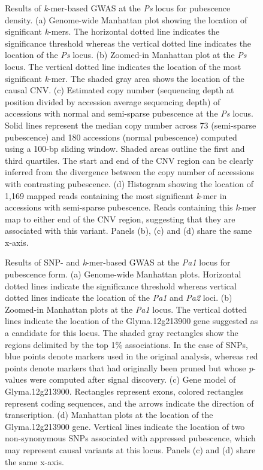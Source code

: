 \documentclass[doublespacing]{bmcart}
\begin{document}
\begin{backmatter}
\begin{figure}[p]
	\caption[Results of \textit{k}-mer-based GWAS at the
	\textit{Ps} locus for pubescence density.]{Results of \textit{k}-mer-based GWAS at the
	\textit{Ps} locus for pubescence density.
	(a) Genome-wide Manhattan plot showing the location of significant \textit{k}-mers. The
	horizontal dotted line indicates the significance threshold whereas the
	vertical dotted line indicates the location of the \textit{Ps} locus.
	(b) Zoomed-in Manhattan plot at the \textit{Ps} locus. The
	vertical dotted line indicates the location of the most significant
	\textit{k}-mer. The shaded gray area shows the location of the causal CNV.
	(c) Estimated copy number (sequencing depth at position divided by
	accession average sequencing depth) of accessions with normal and
	semi-sparse pubescence at the \textit{Ps} locus. Solid lines represent
	the median copy number across 73 (semi-sparse pubescence) and 180
	accessions (normal pubescence) computed using a 100-bp sliding window.
	Shaded areas outline the first and third quartiles. The start and end
	of the CNV region can be clearly inferred from the divergence between
	the copy number of accessions with contrasting pubescence.
	(d) Histogram showing the location of 1,169 mapped reads containing the
	most significant \textit{k}-mer in accessions with semi-sparse pubescence.
	Reads containing this \textit{k}-mer map to either end of the CNV
	region, suggesting that they are associated with this variant. Panels
	(b), (c) and (d) share the same x-axis.}
	\label{pubescence-density-main-figure}
\end{figure}

\begin{figure}[p]
	\caption{Results of SNP- and \textit{k}-mer-based GWAS at the
	\textit{Pa1} locus for pubescence form. (a) Genome-wide Manhattan plots.
	Horizontal dotted lines indicate the significance
	threshold whereas vertical dotted lines indicate the location of the
	\textit{Pa1} and \textit{Pa2} loci. (b) Zoomed-in Manhattan plots at the \textit{Pa1} locus.
	The vertical dotted lines indicate the location of the
	Glyma.12g213900 gene suggested as a candidate for this locus. The shaded gray
	rectangles show the regions delimited by the top 1\% associations.
	In the case of SNPs, blue points denote markers used in the
	original analysis, whereas red points denote markers that had originally
	been pruned but whose \emph{p}-values were computed after signal
	discovery.
	(c) Gene model of Glyma.12g213900. Rectangles represent exons, colored
	rectangles represent coding sequences, and the arrows indicate the
	direction of transcription.
	(d) Manhattan plots at the location of the Glyma.12g213900 gene.
	Vertical lines indicate the location of two non-synonymous
	SNPs associated with appressed pubescence, which may represent causal variants
	at this locus. Panels (c) and (d) share the same x-axis.}
	\label{pubescence-form-main-figure}
\end{figure}


\end{backmatter}
\end{document}
